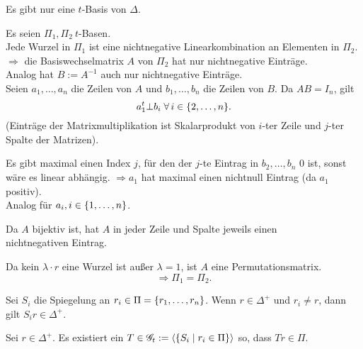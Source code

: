 \documentclass{article}
\begin{document}
\begin{satz} %
    Es gibt nur eine \( t \)-Basis von \( \Delta \).
\end{satz}
\begin{bew}
    Es seien \( \Pi_1, \Pi_2\ t \)-Basen.\\
    Jede Wurzel in \( \Pi_1 \) ist eine nichtnegative 
    Linearkombination an Elementen in \( \Pi_2 \).\\
    \( \Rightarrow \) die Basiswechselmatrix \(A\) von 
    \( \Pi_2 \) hat nur nichtnegative Einträge.\\
    Analog hat \( B := A^{-1} \) auch nur nichtnegative 
    Einträge. \\
    Seien \( a_1, \ldots, a_n \) die Zeilen von \(A\) 
    und \( b_1, \ldots, b_n \) die Zeilen von \(B\).
    Da \( AB = I_n \), gilt 
    \[ a_1^t \bot b_i \;\forall i \in \set{2, \ldots, n}. \]
    (Einträge der Matrixmultiplikation ist Skalarprodukt 
    von \(i\)-ter Zeile und \(j\)-ter Spalte der Matrizen).

    Es gibt maximal einen Index \( j \), für den der 
    \( j \)-te Eintrag in \( b_2, \ldots, b_n \) 
    \( 0 \) ist, sonst wäre es linear abhängig.
    \( \Rightarrow a_1 \) hat maximal einen 
    nichtnull Eintrag (da \(a_1\) positiv).\\
    Analog für \( a_i, i \in \{1, \ldots, n\} \).

    Da \(A\) bijektiv ist, hat \(A\) in jeder Zeile und 
    Spalte jeweils einen \\
    nichtnegativen Eintrag.

    Da kein \( \lambda \cdot r \) eine Wurzel ist 
    außer \( \lambda = 1 \), ist \( A \) eine 
    Permutationsmatrix.
    \[ \Rightarrow \Pi_1 = \Pi_2. \]
\end{bew}

\begin{satz} %
    Sei \( S_i \) die Spiegelung an 
    \( r_i \in \Pi = \{r_1, \ldots, r_n\} \).
    Wenn \( r \in \Delta^+ \) und \( r_i \neq r \), 
    dann gilt \( S_i r \in \Delta^+ \).
\end{satz}

\begin{satz} %
    Sei \( r \in \Delta^+ \). Es existiert ein \( T \in 
    \mathscr{G}_t := \langle 
    \{S_i \;\vert\; r_i \in \Pi\} \rangle \) so, dass 
    \( Tr \in \Pi \).
\end{satz}
\end{document}
